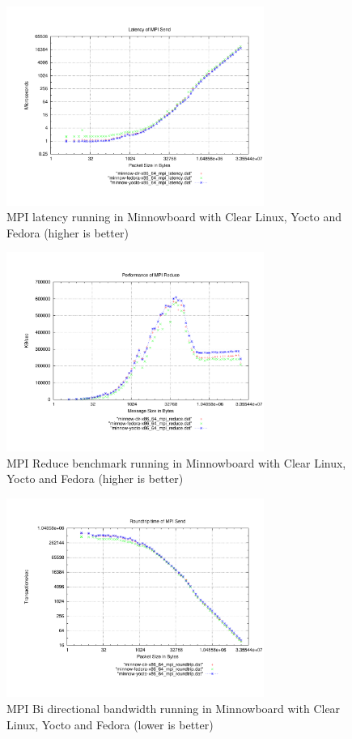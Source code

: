 \begin{figure}[H]
\centering
\includegraphics[width=0.75\textwidth]{images/mpbench_yocto_experiments/mpi_latency.pdf}
\caption{MPI latency running in Minnowboard with Clear Linux,
Yocto and Fedora (higher is better)}
\label{fig:5.12}
\end{figure}

\begin{figure}[H]
\centering
\includegraphics[width=0.75\textwidth]{images/mpbench_yocto_experiments/mpi_reduce.pdf}
\caption{MPI Reduce benchmark running in Minnowboard with Clear Linux, Yocto
and Fedora (higher is better)}
\label{fig:5.13}
\end{figure}

\begin{figure}[H]
\centering
\includegraphics[width=0.75\textwidth]{images/mpbench_yocto_experiments/mpi_roundtrip.pdf}
\caption{MPI Bi directional bandwidth running in Minnowboard with Clear Linux,
Yocto and Fedora (lower is better)}
\label{fig:5.14}
\end{figure}


